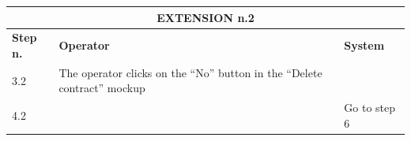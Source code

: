 {{{			\begin{table}[h]
			\begin{tabular}{|p{2cm}|p{6cm}|p{6cm}|}
			\hline
				\multicolumn{3}{|c|}{EXTENSION n.2} \\
			\hline
				\vspace{1mm} \bfseries{Step n.} \vspace{1mm} & 
				\vspace{1mm} \bfseries{Operator} \vspace{1mm} & 
				\vspace{1mm} \bfseries{System} \vspace{1mm}\\
			\hline
				\vspace{1mm} 3.2 \vspace{1mm} &
				\vspace{1mm} The operator clicks on the “No”  button  in the “Delete contract”  mockup \vspace{1mm} & 
				\vspace{1mm} \vspace{1mm} \\
			\hline
				\vspace{1mm} 4.2 \vspace{1mm} &
				\vspace{1mm} \vspace{1mm} & 
				\vspace{1mm} Go to step 6 \vspace{1mm} \\
			\hline
			\end{tabular}
			\end{table}
			
			\clearpage

}}}
